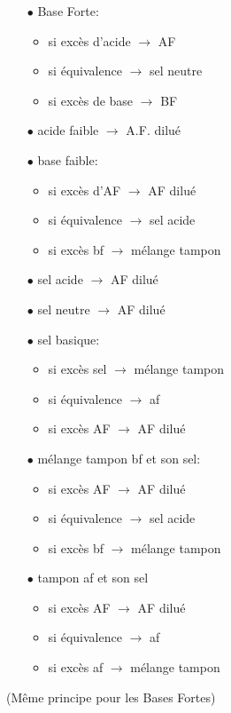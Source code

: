 \documentclass[11pt,a4paper,french]{article}
\begin{document}
\begin{itemize}
\item[$\bullet$] Base Forte:
	\begin{itemize}
	\item si excès d'acide $\rightarrow$ AF
	\item si équivalence $\rightarrow$ sel neutre
	\item si excès de base $\rightarrow$ BF
	\end{itemize}
\item[$\bullet$] acide faible $\rightarrow$ A.F. dilué
\item[$\bullet$] base faible:
	\begin{itemize}
	\item si excès d'AF $\rightarrow$ AF dilué
	\item si équivalence $\rightarrow$ sel acide
	\item si excès bf $\rightarrow$ mélange tampon
	\end{itemize}
\item[$\bullet$] sel acide $\rightarrow$ AF dilué
\item[$\bullet$] sel neutre $\rightarrow$ AF dilué
\item[$\bullet$] sel basique:
	\begin{itemize}
	\item si excès sel $\rightarrow$ mélange tampon
	\item si équivalence $\rightarrow$ af
	\item si excès AF $\rightarrow$ AF dilué
	\end{itemize}
\item[$\bullet$] mélange tampon bf et son sel:
	\begin{itemize}
	\item si excès AF $\rightarrow$ AF dilué
	\item si équivalence $\rightarrow$ sel acide
	\item si excès bf $\rightarrow$ mélange tampon
	\end{itemize}
\item[$\bullet$] tampon af et son sel
	\begin{itemize}
	\item si excès AF $\rightarrow$ AF dilué
	\item si équivalence $\rightarrow$ af
	\item si excès af $\rightarrow$ mélange tampon
	\end{itemize}
\end{itemize}
(Même principe pour les Bases Fortes)
\end{document}
